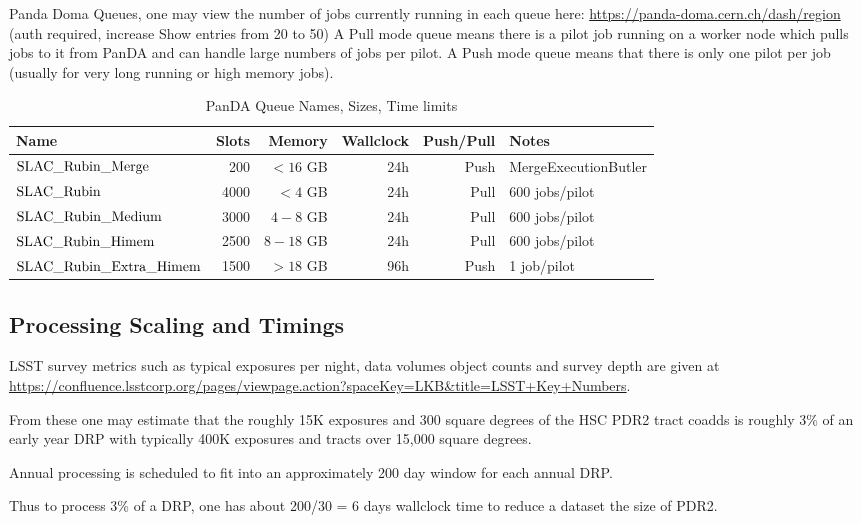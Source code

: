 Panda Doma Queues, one may view the number of jobs currently running in each queue here:
\url{https://panda-doma.cern.ch/dash/region} (auth required, increase Show entries from 20 to 50)
A Pull mode queue means there is a pilot job running on a worker node which pulls jobs to it from PanDA and
can handle large numbers of jobs per pilot.  A Push mode queue means that there is only one pilot per
job (usually for very long running or high memory jobs). 

\normalsize 
\begin{center}
\begin{longtable}{|l|r|r|r|r|l|} 
\caption{PanDA Queue Names, Sizes, Time limits} \label{tab:pandaqueues}\\
\hline 
\textbf{Name}&\textbf{Slots}&\textbf{Memory}&\textbf{Wallclock}&\textbf{Push/Pull}&\textbf{Notes} \\ 
\hline
$\rm SLAC\_Rubin\_Merge$ & 200 & $<16$ GB & 24h & Push & MergeExecutionButler \\
$\rm SLAC\_Rubin$ & 4000 & $<4$ GB & 24h & Pull & 600 jobs/pilot \\
$\rm SLAC\_Rubin\_Medium$ & 3000 & $4-8$ GB & 24h & Pull &  600 jobs/pilot\\
$\rm SLAC\_Rubin\_Himem$ & 2500& $8-18$ GB & 24h & Pull &  600 jobs/pilot \\
$\rm SLAC\_Rubin\_Extra\_Himem$ & 1500 & $>18$ GB & 96h & Push & 1 job/pilot \\
\hline
\end{longtable} 
\end{center}
\normalsize


\subsection{Processing Scaling and Timings}


LSST survey metrics such as typical exposures per night, data volumes
object counts and survey depth are given at 
\url{https://confluence.lsstcorp.org/pages/viewpage.action?spaceKey=LKB&title=LSST+Key+Numbers}.

From these one may estimate that the roughly 15K exposures and 300 
square degrees of the HSC PDR2 tract coadds is roughly 3\% of an 
early year DRP with typically 400K exposures and tracts 
over 15,000 square degrees.

Annual processing is scheduled to fit into an approximately 200 day window
for each annual DRP.

Thus to process 3\% of a DRP, one has about 200/30 = 6 days wallclock time
to reduce a dataset the size of PDR2.

